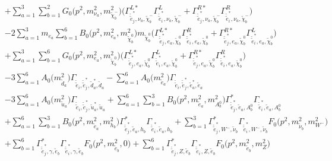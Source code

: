 \begin{itemize}
\begin{align}
 &+\sum_{a=1}^{3}\sum_{b=1}^{2}{G_0\Big(p^{2},m^2_{\nu_{{a}}},m^2_{\tilde{\chi}^-_{{b}}}\Big)} \Big({\Gamma^{L*}_{\check{\tilde{e}}^*_{{j}},\nu_{{a}},\tilde{\chi}^-_{{b}}}} {\Gamma^L_{\check{\tilde{e}}^*_{{i}},\nu_{{a}},\tilde{\chi}^-_{{b}}}}  + {\Gamma^{R*}_{\check{\tilde{e}}^*_{{j}},\nu_{{a}},\tilde{\chi}^-_{{b}}}} {\Gamma^R_{\check{\tilde{e}}^*_{{i}},\nu_{{a}},\tilde{\chi}^-_{{b}}}} \Big)\nonumber \\ 
 &-2 \sum_{a=1}^{3}m_{e_{{a}}} \sum_{b=1}^{6}{B_0\Big(p^{2},m^2_{e_{{a}}},m^2_{\tilde{\chi}^0_{{b}}}\Big)} m_{\tilde{\chi}^0_{{b}}} \Big({\Gamma^{L*}_{\check{\tilde{e}}^*_{{j}},e_{{a}},\tilde{\chi}^0_{{b}}}} {\Gamma^R_{\check{\tilde{e}}^*_{{i}},e_{{a}},\tilde{\chi}^0_{{b}}}}  + {\Gamma^{R*}_{\check{\tilde{e}}^*_{{j}},e_{{a}},\tilde{\chi}^0_{{b}}}} {\Gamma^L_{\check{\tilde{e}}^*_{{i}},e_{{a}},\tilde{\chi}^0_{{b}}}} \Big)  \nonumber \\ 
 &+\sum_{a=1}^{3}\sum_{b=1}^{6}{G_0\Big(p^{2},m^2_{e_{{a}}},m^2_{\tilde{\chi}^0_{{b}}}\Big)} \Big({\Gamma^{L*}_{\check{\tilde{e}}^*_{{j}},e_{{a}},\tilde{\chi}^0_{{b}}}} {\Gamma^L_{\check{\tilde{e}}^*_{{i}},e_{{a}},\tilde{\chi}^0_{{b}}}}  + {\Gamma^{R*}_{\check{\tilde{e}}^*_{{j}},e_{{a}},\tilde{\chi}^0_{{b}}}} {\Gamma^R_{\check{\tilde{e}}^*_{{i}},e_{{a}},\tilde{\chi}^0_{{b}}}} \Big)\nonumber \\ 
 &-3 \sum_{a=1}^{6}{A_0\Big(m^2_{\tilde{d}_{{a}}}\Big)} {\Gamma_{\check{\tilde{e}}_{{i}},\check{\tilde{e}}^*_{{j}},\tilde{d}^*_{{a}},\tilde{d}_{{a}}}}  - \sum_{a=1}^{6}{A_0\Big(m^2_{\tilde{e}_{{a}}}\Big)} {\Gamma_{\check{\tilde{e}}_{{i}},\check{\tilde{e}}^*_{{j}},\tilde{e}^*_{{a}},\tilde{e}_{{a}}}}  \nonumber \\ 
 &-3 \sum_{a=1}^{6}{A_0\Big(m^2_{\tilde{u}_{{a}}}\Big)} {\Gamma_{\check{\tilde{e}}_{{i}},\check{\tilde{e}}^*_{{j}},\tilde{u}^*_{{a}},\tilde{u}_{{a}}}}  +\sum_{a=1}^{6}\sum_{b=1}^{3}{B_0\Big(p^{2},m^2_{\tilde{e}_{{a}}},m^2_{A^0_{{b}}}\Big)} {\Gamma^*_{\check{\tilde{e}}^*_{{j}},\tilde{e}_{{a}},A^0_{{b}}}} {\Gamma_{\check{\tilde{e}}^*_{{i}},\tilde{e}_{{a}},A^0_{{b}}}} \nonumber \\ 
 &+\sum_{a=1}^{6}\sum_{b=1}^{3}{B_0\Big(p^{2},m^2_{\tilde{e}_{{a}}},m^2_{h_{{b}}}\Big)} {\Gamma^*_{\check{\tilde{e}}^*_{{j}},\tilde{e}_{{a}},h_{{b}}}} {\Gamma_{\check{\tilde{e}}^*_{{i}},\tilde{e}_{{a}},h_{{b}}}} +\sum_{b=1}^{3}{\Gamma^*_{\check{\tilde{e}}^*_{{j}},W^-,\tilde{\nu}_{{b}}}} {\Gamma_{\check{\tilde{e}}^*_{{i}},W^-,\tilde{\nu}_{{b}}}} {F_0\Big(p^{2},m^2_{\tilde{\nu}_{{b}}},m^2_{W^-}\Big)} \nonumber \\ 
 &+\sum_{b=1}^{6}{\Gamma^*_{\check{\tilde{e}}^*_{{j}},\gamma,\tilde{e}_{{b}}}} {\Gamma_{\check{\tilde{e}}^*_{{i}},\gamma,\tilde{e}_{{b}}}} {F_0\Big(p^{2},m^2_{\tilde{e}_{{b}}},0\Big)} +\sum_{b=1}^{6}{\Gamma^*_{\check{\tilde{e}}^*_{{j}},Z,\tilde{e}_{{b}}}} {\Gamma_{\check{\tilde{e}}^*_{{i}},Z,\tilde{e}_{{b}}}} {F_0\Big(p^{2},m^2_{\tilde{e}_{{b}}},m^2_{Z}\Big)} \nonumber \\ 

\end{align}
\end{itemize}
